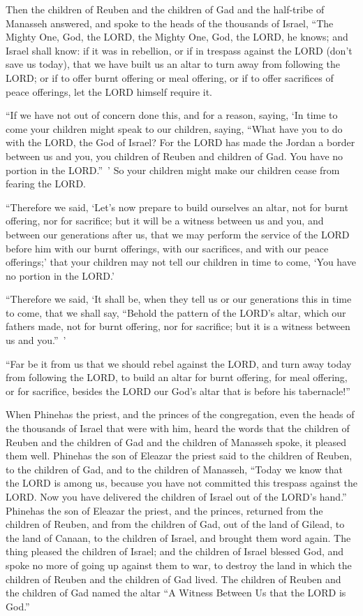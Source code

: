 \myverse{}Then the children of Reuben and the children of Gad and the
half-tribe of Manasseh answered, and spoke to the heads of the thousands of Israel,
\myverse{}“The Mighty One, God, the LORD, the Mighty One, God, the LORD, he knows;
and Israel shall know: if it was in rebellion, or if in trespass against the LORD (don’t save us today),
\myverse{}that we have built us an altar to turn away from following the LORD; or if
to offer burnt offering or meal offering, or if to offer sacrifices of peace offerings, let the LORD himself
require it.

\myverse{}“If we have not out of concern done this, and for a reason,
saying, ‘In time to come your children might speak to our children, saying, “What have you to do with
the LORD, the God of Israel?
\myverse{}For the LORD has made the Jordan a border between us and you, you children
of Reuben and children of Gad. You have no portion in the LORD.” ’ So your children might make our children
cease from fearing the LORD.

\myverse{}“Therefore we said, ‘Let’s now prepare to build ourselves an
altar, not for burnt offering, nor for sacrifice;
\myverse{}but it will be a witness between us and you, and between our generations
after us, that we may perform the service of the LORD before him with our burnt offerings, with our sacrifices,
and with our peace offerings;’ that your children may not tell our children in time to come, ‘You have
no portion in the LORD.’

\myverse{}“Therefore we said, ‘It shall be, when they tell us or our generations
this in time to come, that we shall say, “Behold the pattern of the LORD’s altar, which our fathers made,
not for burnt offering, nor for sacrifice; but it is a witness between us and you.” ’

\myverse{}“Far be it from us that we should rebel against the LORD, and
turn away today from following the LORD, to build an altar for burnt offering, for meal offering, or for
sacrifice, besides the LORD our God’s altar that is before his tabernacle!”

\myverse{}When Phinehas the priest, and the princes of the congregation,
even the heads of the thousands of Israel that were with him, heard the words that the children of Reuben
and the children of Gad and the children of Manasseh spoke, it pleased them well.
\myverse{}Phinehas the son of Eleazar the priest said to the children of Reuben, to
the children of Gad, and to the children of Manasseh, “Today we know that the LORD is among us, because
you have not committed this trespass against the LORD. Now you have delivered the children of Israel out
of the LORD’s hand.”
\myverse{}Phinehas the son of Eleazar the priest, and the princes, returned from the
children of Reuben, and from the children of Gad, out of the land of Gilead, to the land of Canaan, to
the children of Israel, and brought them word again.
\myverse{}The thing pleased the children of Israel; and the children of Israel blessed
God, and spoke no more of going up against them to war, to destroy the land in which the children of Reuben
and the children of Gad lived.
\myverse{}The children of Reuben and the children of Gad named the altar “A Witness
Between Us that the LORD is God.”



